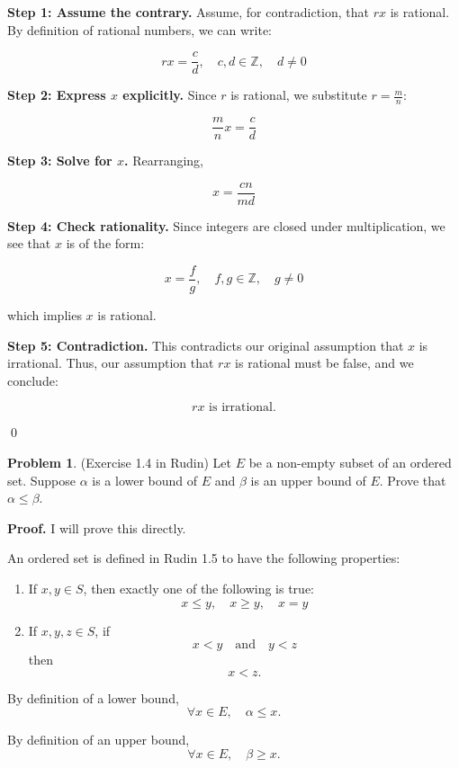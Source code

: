 \documentclass[12pt,oneside]{article}
\theoremstyle{definition}
\newtheorem{problem}{Problem}
\begin{document}
\textbf{Step 1: Assume the contrary.}  
Assume, for contradiction, that $r x$ is rational.  
By definition of rational numbers, we can write:

\[
r x = \frac{c}{d}, \quad c, d \in \mathbb{Z}, \quad d \neq 0
\]

\textbf{Step 2: Express $x$ explicitly.}  
Since $r$ is rational, we substitute $r = \frac{m}{n}$:

\[
\frac{m}{n} x = \frac{c}{d}
\]

\textbf{Step 3: Solve for $x$.}  
Rearranging,

\[
x = \frac{c n}{m d}
\]

\textbf{Step 4: Check rationality.}  
Since integers are closed under multiplication, we see that $x$ is of the form:

\[
x = \frac{f}{g}, \quad f, g \in \mathbb{Z}, \quad g \neq 0
\]

which implies $x$ is rational.

\textbf{Step 5: Contradiction.}  
This contradicts our original assumption that $x$ is irrational.  
Thus, our assumption that $r x$ is rational must be false, and we conclude:

\[
r x \text{ is irrational.}
\]

\qed

\newpage

\begin{problem}
(Exercise 1.4 in Rudin) 
Let $E$ be a non-empty subset of an ordered set. 
Suppose $\alpha$ is a lower bound of $E$ and $\beta$ is an upper bound of $E$. 
Prove that $\alpha \leq \beta$. 
\end{problem}

\textbf{Proof.} I will prove this directly.

An ordered set is defined in Rudin 1.5 to have the following properties:

\begin{enumerate}
    \item If \( x, y \in S \), then exactly one of the following is true:
    \[
    x \leq y, \quad x \geq y, \quad x = y
    \]

    \item If \( x, y, z \in S \), if
    \[
    x < y \quad \text{and} \quad y < z
    \]
    then
    \[
    x < z.
    \]
\end{enumerate}

By definition of a lower bound,
\[
\forall x \in E, \quad \alpha \leq x.
\]

By definition of an upper bound,
\[
\forall x \in E, \quad \beta \geq x.
\]
\end{document}
